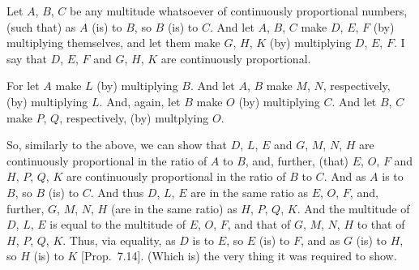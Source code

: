 \begin{Parallel}{}{}
{Let $A$, $B$, $C$ be any multitude whatsoever of continuously proportional numbers, (such that) as $A$ (is) to $B$, so $B$ (is) to $C$. And
let $A$, $B$, $C$ make $D$, $E$, $F$ (by) multiplying themselves,
and let them make $G$, $H$, $K$ (by) multiplying $D$, $E$, $F$. 
I say that $D$, $E$, $F$ and $G$, $H$, $K$ are continuously proportional.

\epsfysize=2.2in
\centerline{}

For let $A$ make $L$ (by) multiplying $B$. And let  $A$, $B$
make  $M$, $N$, respectively, (by) multiplying $L$. And, again, let
$B$ make $O$ (by) multiplying $C$. And let  $B$, $C$
make  $P$, $Q$, respectively, (by) multplying $O$.

So, similarly to the above, we can show that $D$, $L$, $E$ and
$G$, $M$, $N$, $H$ are continuously proportional in the ratio of
$A$ to $B$, and, further, (that) $E$, $O$, $F$ and $H$, $P$, $Q$, $K$
are continuously proportional in the ratio of $B$ to $C$. And as $A$ is to $B$, so $B$ (is) to $C$. And thus $D$, $L$, $E$ are in the same ratio as
$E$, $O$, $F$, and, further, $G$, $M$, $N$, $H$ (are in the same ratio)
as $H$, $P$, $Q$, $K$. And the multitude of $D$, $L$, $E$ is equal
to the multitude of $E$, $O$, $F$, and that of $G$, $M$, $N$, $H$ to that of $H$, $P$, $Q$, $K$. Thus, via equality, as $D$ is to $E$, so $E$ (is) to $F$, and
as $G$ (is) to $H$, so $H$ (is) to $K$ [Prop.~7.14]. (Which is) the very thing it was required to show.}
\end{Parallel}

